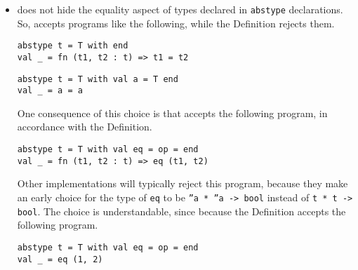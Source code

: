 \begin{itemize}
\item
{\mlton} does not hide the equality aspect of types declared in
{\tt abstype} declarations.  So, {\mlton} accepts programs like the
following, while the Definition rejects them.
\begin{verbatim}
abstype t = T with end
val _ = fn (t1, t2 : t) => t1 = t2
\end{verbatim}

\begin{verbatim}
abstype t = T with val a = T end
val _ = a = a
\end{verbatim}

One consequence of this choice is that {\mlton} accepts the following
program, in accordance with the Definition.
\begin{verbatim}
abstype t = T with val eq = op = end
val _ = fn (t1, t2 : t) => eq (t1, t2)
\end{verbatim}
Other implementations will typically reject this program, because they
make an early choice for the type of {\tt eq} to be {\tt ''a * ''a ->
bool} instead of {\tt t * t -> bool}.  The choice is understandable,
since because the Definition accepts the following program.
\begin{verbatim}
abstype t = T with val eq = op = end
val _ = eq (1, 2)
\end{verbatim}

\end{itemize}
